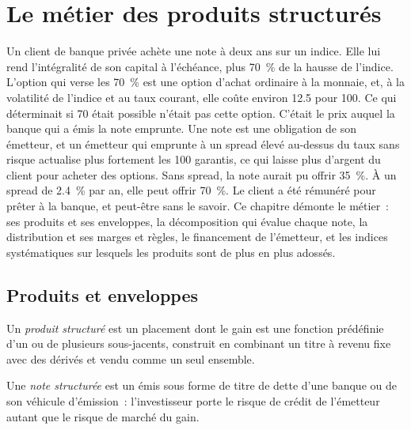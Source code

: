 \chapter{Le métier des produits structurés}\label{ch:dv:the-structured-products-business}

Un client de banque privée achète une note à deux ans sur un indice. Elle lui rend l'intégralité de son capital à l'échéance, plus 70~\% de la
hausse de l'indice. L'option qui verse les 70~\% est une option d'achat ordinaire à la monnaie, et, à la volatilité de l'indice et au
taux courant, elle coûte environ 12.5 pour 100. Ce qui déterminait si 70 était possible n'était pas cette option. C'était le prix auquel
la banque qui a émis la note emprunte. Une note est une obligation de son émetteur, et un émetteur qui emprunte à un spread élevé
au-dessus du taux sans risque actualise plus fortement les 100 garantis, ce qui laisse plus d'argent du client pour acheter des options.
Sans spread, la note aurait pu offrir 35~\%. À un spread de 2.4~\% par an, elle peut offrir 70~\%. Le client a été rémunéré pour
prêter à la banque, et peut-être sans le savoir. Ce chapitre démonte le métier~: ses produits et ses enveloppes, la
décomposition qui évalue chaque note, la distribution et ses marges et règles, le financement de l'émetteur, et les
indices systématiques sur lesquels les produits sont de plus en plus adossés.

\section{Produits et enveloppes}

\begin{definition}\label{def:dv:the-structured-products-business:product}
Un \emph{produit structuré} est un placement dont le gain est une fonction prédéfinie d'un ou de plusieurs
sous-jacents, construit en combinant un titre à revenu fixe avec des dérivés et vendu comme un seul ensemble.
\end{definition}

\begin{definition}\label{def:dv:the-structured-products-business:note}
Une \emph{note structurée} est un  émis sous forme de titre de dette d'une banque ou de son
véhicule d'émission~: l'investisseur porte le risque de crédit de l'émetteur autant que le risque de marché du gain.
\end{definition}

